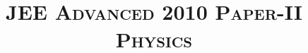 \documentclass{article}
\title{\textsc{JEE Advanced 2010 Paper-II\\Physics}}
\date{}
\begin{document}
\maketitle
\begin{enumerate}
    
    
    
    
    
    
    
    
    
    
    
    
    
    
    
\end{enumerate}
\end{document}
